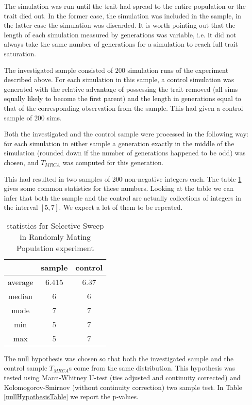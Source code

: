 \documentclass{l4proj}
\begin{document}
The simulation was run until the trait had spread to the entire population or the trait died out. In the former case, the simulation was included in the sample, in the latter case the simulation was discarded. It is worth pointing out that the length of each simulation measured by generations was variable, i.e. it did not always take the same number of generations for a simulation to reach full trait saturation.

The investigated sample consisted of 200 simulation runs of the experiment described above. For each simulation in this sample, a control simulation was generated with the relative advantage of possessing the trait removed (all sims equally likely to become the first parent) and the length in generations equal to that of the corresponding observation from the sample. This had given a control sample of 200 sims.

Both the investigated and the control sample were processed in the following way: for each simulation in either sample a generation exactly in the middle of the simulation (rounded down if the number of generations happened to be odd) was chosen, and $T_{MRCA}$ was computed for this generation.

This had resulted in two samples of 200 non-negative integers each. The table \ref{populationTable} gives some common statistics for these numbers. Looking at the table we can infer that both the sample and the control are actually collections of integers in the interval $[5, 7]$. We expect a lot of them to be repeated.

\begin{table}[]
    \centering
    \begin{tabular}{|c|c|c|}
    \hline
     & sample & control \\ \hline\hline
     average & 6.415 & 6.37 \\ \hline
     median & 6 & 6 \\ \hline
     mode & 7 & 7 \\ \hline
     min & 5 & 7 \\ \hline
     max & 5 & 7 \\ \hline
    \end{tabular}
    \caption{statistics for Selective Sweep in Randomly Mating Population experiment}
    \label{populationTable}
\end{table}

The null hypothesis was chosen so that both the investigated sample and the control sample $T_{MRCA}$s come from the same distribution. This hypothesis was tested using Mann-Whitney U-test (ties adjusted and continuity corrected) and Kolomogorov-Smirnov (without continuity correction) two sample test. In Table \ref{nullHypothesisTable} we report the p-values.
\end{document}
